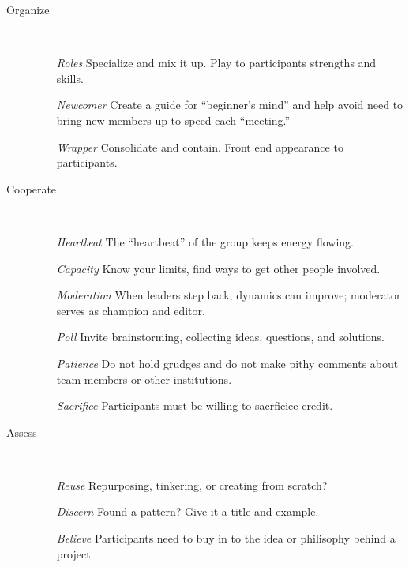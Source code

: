 \documentclass{acm_proc_article-sp}
\begin{document}
\hspace{.2in}
\begin{minipage}{.4\textwidth}
\begin{description}
\item[Organize] \quad \\[-.1in]
\begin{itemize}
\item[\emph{Roles}] Specialize and mix it up. Play to participants strengths
  and skills.
\item[\emph{Newcomer}] Create a guide for ``beginner's mind'' and help avoid
  need to bring new members up to speed each ``meeting.''
\item[\emph{Wrapper}] Consolidate and contain. Front end appearance to
  participants.
\end{itemize}
\end{description}
\end{minipage}

\hspace{.2in}
\begin{minipage}{.4\textwidth}
\begin{description}
\item[Cooperate] \quad \\[-.1in]
\begin{itemize}
\item[\emph{Heartbeat}] The ``heartbeat'' of the group keeps energy flowing.
\item[\emph{Capacity}] Know your limits, find ways to get other people
  involved.
\item[\emph{Moderation}] When leaders step back, dynamics can improve;
  moderator serves as champion and editor.
\item[\emph{Poll}] Invite brainstorming, collecting ideas, questions, and
  solutions.
\item[\emph{Patience}] Do not hold grudges and do not make pithy comments
  about team members or other institutions.
\item[\emph{Sacrifice}] Participants must be willing to sacrficice credit.
\end{itemize}
\end{description}
\end{minipage}

\hspace{.2in}
\begin{minipage}{.4\textwidth}
\begin{description}
\item[Assess]  \quad \\[-.1in]
\begin{itemize}
\item[\emph{Reuse}] Repurposing, tinkering, or creating from scratch?
\item[\emph{Discern}] Found a pattern? Give it a title and example.
\item[\emph{Believe}] Participants need to buy in to the idea or philisophy
  behind a project.
\end{itemize}
\end{description}
\end{minipage}
\end{document}
